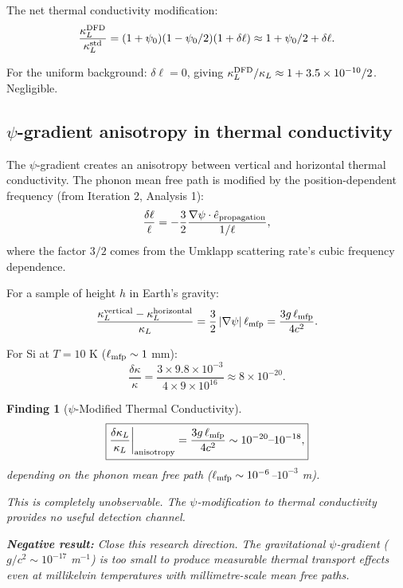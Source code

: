 \documentclass[11pt]{article}
\newtheorem{finding}{Finding}
\newcommand{\ee}[1]{\times 10^{#1}}
\begin{document}
The net thermal conductivity modification:
\begin{equation}
\frac{\kappa_L^{\rm DFD}}{\kappa_L^{\rm std}} = (1 + \psi_0)(1 - \psi_0/2)(1 + \delta\ell) \approx 1 + \psi_0/2 + \delta\ell.
\end{equation}

For the uniform background: $\delta\ell = 0$, giving $\kappa_L^{\rm DFD}/\kappa_L \approx 1 + 3.5\ee{-10}/2$. Negligible.

\subsection{$\psi$-gradient anisotropy in thermal conductivity}

The $\psi$-gradient creates an anisotropy between vertical and horizontal thermal conductivity. The phonon mean free path is modified by the position-dependent frequency (from Iteration 2, Analysis 1):
\begin{equation}
\frac{\delta\ell}{\ell} = -\frac{3}{2}\frac{\nabla\psi \cdot \hat{e}_{\rm propagation}}{1/\ell},
\end{equation}
where the factor $3/2$ comes from the Umklapp scattering rate's cubic frequency dependence.

For a sample of height $h$ in Earth's gravity:
\begin{equation}
\frac{\kappa_L^{\rm vertical} - \kappa_L^{\rm horizontal}}{\kappa_L} = \frac{3}{2}\,|\nabla\psi|\,\ell_{\rm mfp} = \frac{3g\,\ell_{\rm mfp}}{4c^2}.
\end{equation}

For Si at $T = 10$ K ($\ell_{\rm mfp} \sim 1$ mm):
\begin{equation}
\frac{\delta\kappa}{\kappa} = \frac{3\times 9.8 \times 10^{-3}}{4\times 9\ee{16}} \approx 8\ee{-20}.
\end{equation}

\begin{finding}[$\psi$-Modified Thermal Conductivity]
\begin{equation}\label{eq:thermal}
\boxed{\frac{\delta\kappa_L}{\kappa_L}\bigg|_{\rm anisotropy} = \frac{3g\,\ell_{\rm mfp}}{4c^2} \sim 10^{-20}\text{--}10^{-18},}
\end{equation}
depending on the phonon mean free path ($\ell_{\rm mfp} \sim 10^{-6}$--$10^{-3}$ m).

This is completely unobservable. The $\psi$-modification to thermal conductivity provides no useful detection channel.

\textbf{Negative result:} Close this research direction. The gravitational $\psi$-gradient ($g/c^2 \sim 10^{-17}$ m$^{-1}$) is too small to produce measurable thermal transport effects even at millikelvin temperatures with millimetre-scale mean free paths.
\end{finding}
\end{document}
